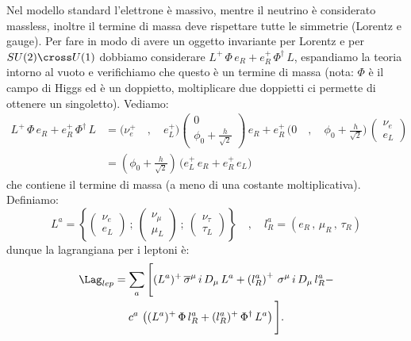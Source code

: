 Nel modello standard l'elettrone è massivo, mentre il neutrino è considerato massless, inoltre il termine di massa deve rispettare tutte le simmetrie (Lorentz e gauge). Per fare in modo di avere un oggetto invariante per Lorentz e per $SU(2) \cross U(1)$ dobbiamo considerare $L^+\, \Phi\, e_R + e_R^+\, \Phi^\dagger\, L$, espandiamo la teoria intorno al vuoto e verifichiamo che questo è un termine di massa (nota: $\Phi$ è il campo di Higgs ed è un doppietto, moltiplicare due doppietti ci permette di ottenere un singoletto). Vediamo:
\begin{align}
    L^+\, \Phi\, e_R + e_R^+\, \Phi^\dagger\, L &= \big( \nu_e^+ \quad , \quad e_L^+ \big) \begin{pmatrix}
        0 \\
        \phi_0 + \frac{h}{\sqrt{2}}
    \end{pmatrix}\, e_R + e_R^+\, \big(0 \quad , \quad \phi_0 + \frac{h}{\sqrt{2}} \big)\, \begin{pmatrix}
        \nu_e \\
        e_L
    \end{pmatrix} \\
    &= \left(\phi_0 + \frac{h}{\sqrt{2}}\right)\, \Big( e_L^+\, e_R + e_R^+\, e_L \Big)
\end{align}
che contiene il termine di massa (a meno di una costante moltiplicativa). Definiamo:
\begin{equation}
    L^a = \left\{ \begin{pmatrix}
        \nu_e \\
        e_L
    \end{pmatrix}\ ;\ \begin{pmatrix}
        \nu_\mu \\
        \mu_L
    \end{pmatrix}\ ;\ \begin{pmatrix}
        \nu_\tau \\
        \tau_L
    \end{pmatrix} \right\} \quad , \quad l_R^a = \left( e_R\, ,\, \mu_R\,  ,\,  \tau_R \right)
\end{equation}
dunque la lagrangiana per i leptoni è:
\begin{multline}
    \Lag_{lep} = \sum_a\Bigg[ (L^a)^+\, \overline{\sigma}^\mu\, i\, D_\mu\, L^a + \left(l_R^a\right)^+\, \sigma^\mu\, i\, D_\mu\, l_R^a - \\
    c^a\, \left( (L^a)^+\, \Phi\, l_R^a + (l_R^a)^+\, \Phi^\dagger\, L^a \right) \Bigg].
\end{multline}


